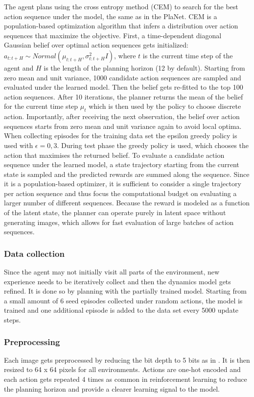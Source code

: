 The agent plans using the cross entropy method (CEM) \cite{Algo.CEM} to search for the best action sequence under the model, the same as in the PlaNet. CEM is a population-based optimization algorithm that infers a distribution over action sequences that maximize the objective.
First, a time-dependent diagonal Gaussian belief over optimal action sequences gets initialized: $a_{t:t+H} ∼ Normal(\mu_{t:t+H}, \sigma^2_{t:t+H}I)$, where $t$ is the current time step of the agent and $H$ is the length of the planning horizon (12 by default). Starting from zero mean and unit variance, 1000 candidate action sequences are sampled and evaluated under the learned model. Then the belief gets re-fitted to the top 100 action sequences. After 10 iterations, the planner returns the mean of the belief for the current time step $\mu_t$ which is then used by the policy to choose discrete action. Importantly, after receiving the next observation, the belief over action sequences starts from zero mean and unit variance again to avoid local optima.
When collecting episodes for the training data set the epsilon greedy policy \cite{Book.RLAI} is used with $\epsilon = 0,3$. During test phase the greedy policy is used, which chooses the action that maximises the returned belief.
To evaluate a candidate action sequence under the learned model, a state trajectory starting from the current state is sampled and the predicted rewards are summed along the sequence. Since it is a population-based optimizer,
it is sufficient to consider a single trajectory per action sequence and thus focus the computational budget on evaluating a larger number of different sequences. Because the reward is modeled as a function of the latent state, the planner can operate purely in latent space without generating images, which allows for fast evaluation of large batches of action sequences.


\subsubsection{Data collection}

Since the agent may not initially visit all parts of the environment, new experience needs to be iteratively collect and then the dynamics model gets refined. It is done so by planning with the partially trained model. Starting from a small amount of 6 seed episodes collected under random actions, the model is trained and one additional episode is added to the data set every 5000 update steps.

\subsubsection{Preprocessing}

Each image gets preprocessed by reducing the bit depth to 5 bits as in \cite{Algo.Glow5bit}. It is then resized to 64 x 64 pixels for all environments.
Actions are one-hot encoded and each action gets repeated 4 times as common in reinforcement learning \cite{Algo.DQN} to reduce the planning horizon and provide a clearer learning signal to the model.
